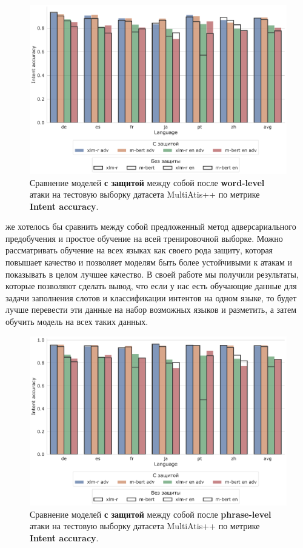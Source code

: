 \begin{figure}[H]
    \centering
    \includegraphics[width=\textwidth]{images/12}
    \caption{Сравнение моделей \textbf{с защитой} между собой после \textbf{word-level} атаки на тестовую выборку датасета MultiAtis++ по метрике \textbf{Intent accuracy}.}\label{fig:figure12}
\end{figure}

 же хотелось бы сравнить между собой предложенный метод адверсариального предобучения и простое обучение на всей тренировочной выборке.
Можно рассматривать обучение на всех языках как своего рода защиту, которая повышает качество и позволяет моделям быть более устойчивыми к атакам и показывать в целом лучшее качество.
В своей работе мы получили результаты, которые позволяют сделать вывод, что если у нас есть обучающие данные для задачи заполнения слотов и классификации интентов на одном языке,
то будет лучше перевести эти данные на набор возможных языков и разметить, а затем обучить модель на всех таких данных.

\begin{figure}[H]
    \centering
    \includegraphics[width=\textwidth]{images/15}
    \caption{Сравнение моделей \textbf{с защитой} между собой после \textbf{phrase-level} атаки на тестовую выборку датасета MultiAtis++ по метрике \textbf{Intent accuracy}.}\label{fig:figure15}
\end{figure}
